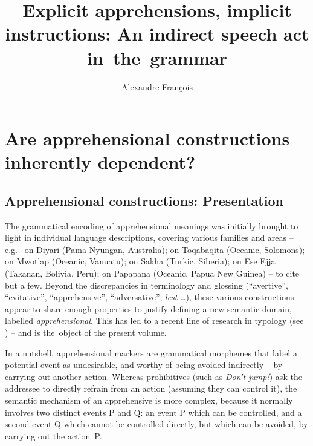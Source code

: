 \documentclass[output=paper,colorlinks,citecolor=brown]{langscibook}
\author{Alexandre François\affiliation{LaTTiCe, CNRS‒ENS-PSL, USN\\Australian National University}}
\title{Explicit apprehensions, implicit instructions:
An indirect speech act in~the~grammar}
\begin{document}
\maketitle


\section{Are apprehensional constructions inherently dependent?}
\label{sec:1}

\subsection{Apprehensional constructions: Presentation}
\label{subsec:acpresentation}

The grammatical encoding of apprehensional meanings was initially brought to light in individual language descriptions, covering various families and areas -- e.g.\ \citet{Austin1981} on Diyari (Pama-Nyungan, Australia); \citet{lichtenberk1995} on Toqa\-ba\-qita (Oceanic, Solomons); \citet{francois2003} on Mwotlap (Oceanic, Vanuatu); \citet{pakendorfschalley2007} on Sakha (Turkic, Siberia); \citet{vuillermet2018a} on Ese Ejja (Takanan, Bolivia, Peru); \citet{smithdennis2021} on Papapana (Oceanic, Papua New Guinea) -- to cite but a few. Beyond the discrepancies in terminology and glossing (``avertive'', ``evitative'', ``apprehensive'', ``adversative'', \textit{lest}  {\ldots}), these various constructions appear to share enough properties to justify defining a new semantic domain, label\-led \textit{apprehensional}. This has led to a recent line of research in typology (see \citealt{Dobrushina2006,  vuillermet2018b, vuillermet2018a, fallerschultzeberndt2018}) -- and is the~object of the present volume.


In a nutshell, apprehensional markers are grammatical morphemes that label a potential event as undesirable, and worthy of being avoided indirectly -- by carrying out another action. Whereas prohibitives (such as \textit{Don't jump!}) ask the addressee to directly refrain from an action (assuming they can control it), the semantic mechanism of an apprehensive is more complex, because it normally involves two distinct events P and Q: an event P which can be controlled, and a second event Q which cannot be controlled directly, but which can be avoided, by carrying out the action~P.
\end{document}
